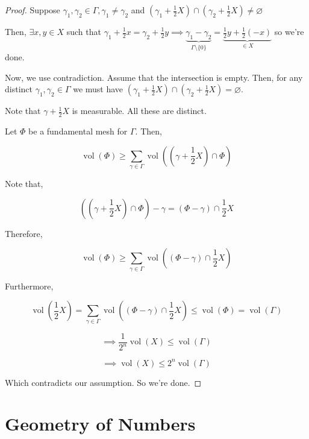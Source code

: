\documentclass[openany]{amsbook}
\numberwithin{section}{chapter}
\theoremstyle{definition}
\begin{document}
\begin{proof}
    Suppose \(\gamma_1, \gamma_2 \in \Gamma, \gamma_1 \neq \gamma_2\) and \(\left(\gamma_1 + \frac{1}{2}X \right) \cap \left(\gamma_2 + \frac{1}{2}X\right) \neq \varnothing\) 

    Then, \(\exists x,y\in X\) such that \(\gamma_1 + \frac{1}{2}x = \gamma_2 + \frac{1}{2}y \implies \underbrace{\gamma_1 - \gamma_2}_{\Gamma \setminus \{ 0 \}} = \underbrace{\frac{1}{2}y + \frac{1}{2}(-x)}_{\in X}\) so we're done. 
    
    Now, we use contradiction. Assume that the intersection is empty. Then, for any distinct \(\gamma_1, \gamma_2\in \Gamma\) we must have \(\left( \gamma_1 + \frac{1}{2}X \right) \cap (\gamma_2 + \frac{1}{2}X) = \varnothing\).

    Note that \(\gamma + \frac{1}{2}X\) is measurable. All these are distinct.

    Let \(\Phi\) be a fundamental mesh for \(\Gamma\). Then,

    \[
        \operatorname{vol}(\Phi) \geq \sum_{\gamma \in \Gamma}^{} \operatorname{vol} \left( \left( \gamma + \frac{1}{2} X \right) \cap \Phi \right) 
    \]

    Note that,
    
    \[
        \left( \left( \gamma + \frac{1}{2}X \right) \cap \Phi \right) - \gamma  = (\Phi - \gamma) \cap \frac{1}{2}X
    \]

    Therefore,

    \[
        \operatorname{vol}(\Phi) \geq \sum_{\gamma \in \Gamma}^{} \operatorname{vol} \left( (\Phi - \gamma) \cap \frac{1}{2}X \right) 
    \]

    Furthermore,

    \[
        \operatorname{vol}\left( \frac{1}{2}X \right) = \sum_{\gamma \in \Gamma}^{} \operatorname{vol} \left( \left( \Phi - \gamma \right) \cap \frac{1}{2} X \right) \leq \operatorname{vol}(\Phi) = \operatorname{vol}(\Gamma)
    \]

    \[
        \implies \frac{1}{2^n} \operatorname{vol}(X) \leq \operatorname{vol}(\Gamma)
    \]

    \[
        \implies \operatorname{vol}(X) \leq 2^n \operatorname{vol}(\Gamma)
    \]

    Which contradicts our assumption. So we're done.


\end{proof}

\chapter{Geometry of Numbers}
\end{document}
